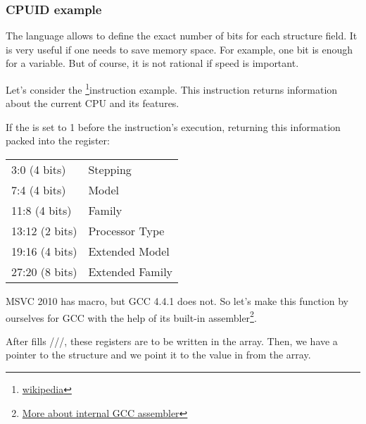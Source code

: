 \subsubsection{CPUID example}

The \CCpp language allows to define the exact number of bits for each structure field.
It is very useful if one needs to save memory space. 
For example, one bit is enough for a \Tbool variable.
But of course, it is not rational if speed is important.

\newcommand{\FNCPUID}{\footnote{\href{http://go.yurichev.com/17069}{wikipedia}}}

\label{cpuid}

Let's consider the \CPUID\FNCPUID instruction example.
This instruction returns information about the current CPU and its features.

If the \EAX is set to 1 before the instruction's execution, 
\CPUID returning this information packed into the \EAX register:

\begin{center}
\begin{tabular}{ | l | l | }
\hline
3:0 (4 bits)& Stepping \\
7:4 (4 bits) & Model \\
11:8 (4 bits) & Family \\
13:12 (2 bits) & Processor Type \\
19:16 (4 bits) & Extended Model \\
27:20 (8 bits) & Extended Family \\
\hline
\end{tabular}
\end{center}

\newcommand{\FNGCCAS}{\footnote{\href{http://go.yurichev.com/17070}
{More about internal GCC assembler}}}

MSVC 2010 has \CPUID macro, but GCC 4.4.1 does not.
So let's make this function by ourselves for GCC with the help of its built-in assembler\FNGCCAS.



After \CPUID fills \EAX/\EBX/\ECX/\EDX, these registers are to be written in the  array.
Then, we have a pointer to the  structure and we point it to the value in \EAX from the  array.

